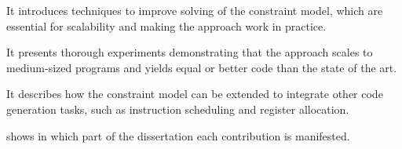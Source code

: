 \begin{contributions}
  \item {}
    It introduces techniques to improve solving of the \gls{constraint model},
    which are essential for scalability and making the approach work in
    practice.

  \item {}
    It presents thorough experiments demonstrating that the approach scales to
    medium-sized \glspl{program} and yields equal or better code than the state
    of the art.

  \item {}
    It describes how the \gls{constraint model} can be extended to integrate
    other \gls{code generation} tasks, such as \gls{instruction scheduling} and
    \gls{register allocation}.
\end{contributions}
%
 shows in which part of the dissertation
each contribution is manifested.

